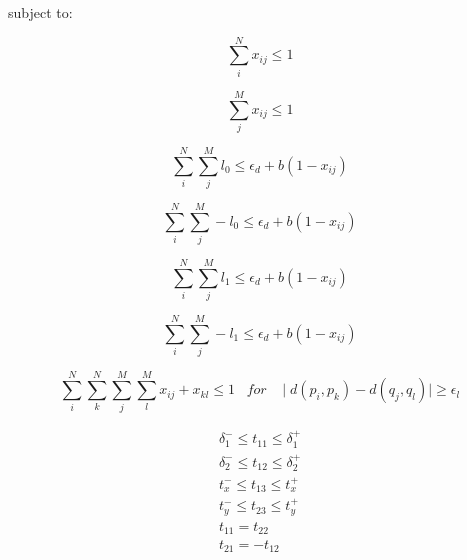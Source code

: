         subject to:
        
        \begin{equation}
            \label{eq:subject_sum_rows}
            \sum_{i}^{N} x_{ij} \leq 1
        \end{equation}
        
        \begin{equation}
            \label{eq:subject_sum_columns}
            \sum_{j}^{M} x_{ij} \leq 1
        \end{equation}

        \begin{equation}
            \label{eq:subject_transformation_0}
            \sum_{i}^{N} \sum_{j}^{M} l_{0} \leq \epsilon_d + b (1 - x_{ij})
        \end{equation}

        \begin{equation}
            \label{eq:subject_transformation_negative_0}
            \sum_{i}^{N} \sum_{j}^{M} -l_{0} \leq \epsilon_d + b (1 - x_{ij})
        \end{equation}

        \begin{equation}
            \label{eq:subject_transformation_1}
            \sum_{i}^{N} \sum_{j}^{M} l_{1} \leq \epsilon_d + b (1 - x_{ij})
        \end{equation}

        \begin{equation}
            \label{eq:subject_transformation_negative_1}
            \sum_{i}^{N} \sum_{j}^{M} -l_{1} \leq \epsilon_d + b (1 - x_{ij})
        \end{equation}

        \begin{equation}
            \label{eq:subject_lines_preservation}
            \sum_{i}^{N} \sum_{k}^{N} \sum_{j}^{M} \sum_{l}^{M} x_{ij} + x_{kl} \leq 1 \;\;\; for \;\;\; \mid d(p_i, p_k) - d(q_j, q_l) \mid \geq \epsilon_l
        \end{equation}

        \begin{equation}
            \label{eq:subject_transformation_variables}
            \begin{gathered}
                \delta_1^- \leq t_{11} \leq \delta_1^+ \\
                \delta_2^- \leq t_{12} \leq \delta_2^+ \\
                t_x^- \leq t_{13} \leq t_x^+ \\
                t_y^- \leq t_{23} \leq t_y^+ \\
                t_{11} = t_{22} \\
                t_{21} = -t_{12}
            \end{gathered}
        \end{equation}
        
